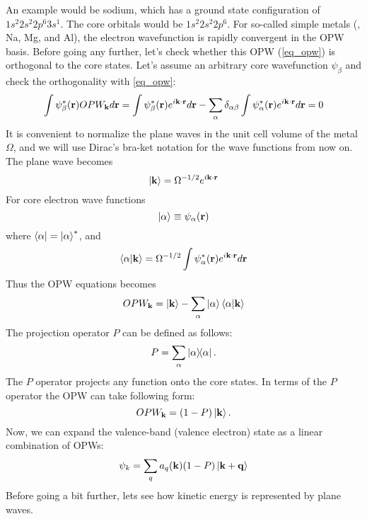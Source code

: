 An example would be sodium, which has a ground state configuration of $1s^2 2s^2 2p^6 3s^1$. The core orbitals would be $1s^2 2s^2 2p^6$. For so-called simple metals (\ie, Na, Mg, and Al), the electron wavefunction is rapidly convergent in the OPW basis. Before going any further, let's check whether this OPW (\ref{eq_opw}) is orthogonal to the core states. Let's assume an arbitrary core wavefunction $\psi_{\beta}$ and check the orthogonality with \ref{eq_opw}:
\begin{equation}
\int\psi^{\ast}_{\beta}(\vb{r})OPW_{\vb{k}}d\vb{r} = \int \psi^{\ast}_{\beta} (\vb{r}) e^{i\vb{k\cdot r}} d\vb{r} - \sum_{\alpha} \delta_{\alpha\beta} \int \psi^{\ast}_{\alpha} (\vb{r}) e^{i\vb{k\cdot r}} d\vb{r} = 0 
\end{equation}
It is convenient to normalize the plane waves in the unit cell volume of the metal $\Omega$, and we will use Dirac's bra-ket notation for the wave functions from now on. The plane wave becomes
\begin{equation}
	\ket{\vb{k}} = \Omega^{-1/2}e^{i\vb{k\cdot r}}
\end{equation}
For core electron wave functions
\begin{equation}
	\ket{\alpha} \equiv \psi_{\alpha} (\vb{r}) 
\end{equation}
where $\bra{\alpha} = \ket{\alpha}^{\ast}$, and
\begin{equation}
	\braket{\alpha}{\vb{k}} = \Omega^{-1/2} \int \psi^{\ast}_{\alpha} (\vb{r}) e^{i\vb{k\cdot r}} d\vb{r}
\end{equation}
Thus the OPW equations becomes
\begin{equation}
	OPW_{\vb{k}} = \ket{\vb{k}} - \sum_{\alpha} \ket{\alpha}\braket{\alpha}{\vb{k}}
\end{equation}
The projection operator $P$ can be defined as follows:
\begin{equation}
\label{eq_proj}
P = \sum_{\alpha} \dyad{\alpha}{\alpha}.
\end{equation}
The $P$ operator projects any function onto the core states. In terms of the $P$ operator the OPW can take following form:
\begin{equation}
	OPW_{\vb{k}} = (1-P)\ket{\vb{k}}.
\end{equation}
Now, we can expand the valence-band (valence electron) state as a linear combination of  OPWs:
\begin{equation}
	\psi_{k} = \sum_q a_q (\vb{k})(1-P)\ket{\vb{k}+\vb{q}}
\end{equation}
Before going a bit further, lets see how kinetic energy is represented by plane waves.
